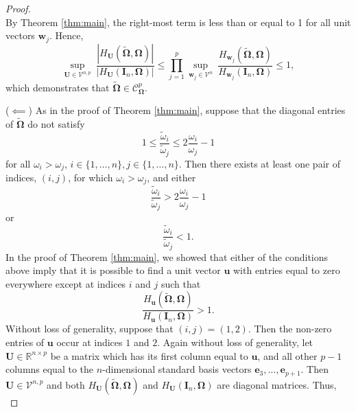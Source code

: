 \documentclass[12pt]{article}
\newcommand{\bl}[1]{{\mathbf #1}}
\newcommand{\bs}[1]{\boldsymbol #1}
\begin{document}
\begin{proof}
\begin{equation*}
\end{equation*}
By Theorem \ref{thm:main}, the right-most term is less than or equal to 1 for all unit vectors $\bl{w}_j$. Hence, 
\begin{equation*}
    \underset{\bl{U} \in \mathcal{V}^{n,p}}{\sup}~ \frac{|H_{\bl{U}}(\tilde{\bs{\Omega}}, \bs{\Omega})|}{|H_{\bl{U}}(\bl{I}_n, \bs{\Omega})|} \leq \prod_{j=1}^p \underset{\bl{w}_j \in \mathcal{V}^n}{\sup}~ \frac{H_{\bl{w}_j}(\tilde{\bs{\Omega}}, \bs{\Omega})}{H_{\bl{w}_j}(\bl{I}_n, \bs{\Omega})} \leq 1,
\end{equation*}
which demonstrates that $\tilde{\bs{\Omega}} \in \mathcal{C}^p_{\bs{\Omega}}$.

($\impliedby$) As in the proof of Theorem \ref{thm:main}, suppose that the diagonal entries of $\tilde{\bs{\Omega}}$ do not satisfy
\begin{equation*}
    1 \leq \frac{\tilde{\omega}_i}{\tilde{\omega}_j} \leq 2\frac{\omega_i}{\omega_j} - 1
\end{equation*}
for all $\omega_i > \omega_j$, $i \in \{1, \dots, n\}, j \in \{1, \dots, n\}$. Then there exists at least one pair of indices, $(i,j)$, for which $\omega_i > \omega_j$, and either
\begin{equation*}
    \frac{\tilde{\omega}_i}{\tilde{\omega}_j} > 2\frac{\omega_i}{\omega_j} - 1
\end{equation*}
or
\begin{equation*}
    \frac{\tilde{\omega}_i}{\tilde{\omega}_j} < 1.
\end{equation*}
In the proof of Theorem \ref{thm:main}, we showed that either of the conditions above imply that it is possible to find a unit vector $\bl{u}$ with entries equal to zero everywhere except at indices $i$ and $j$ such that 
\begin{equation*}
    \frac{H_{\bl{u}}(\tilde{\bs{\Omega}}, \bs{\Omega})}{H_{\bl{u}}(\bl{I}_n, \bs{\Omega})} > 1.
\end{equation*}
Without loss of generality, suppose that $(i,j) = (1,2)$. Then the non-zero entries of $\bl{u}$ occur at indices $1$ and $2$. Again without loss of generality, let $\bl{U} \in \mathbb{R}^{n \times p}$ be a matrix which has its first column equal to $\bl{u}$, and all other $p-1$ columns equal to the $n$-dimensional standard basis vectors $\bs{e}_3, \dots, \bs{e}_{p+1}$. Then $\bl{U} \in \mathcal{V}^{n,p}$ and both $H_{\bl{U}}(\tilde{\bs{\Omega}}, \bs{\Omega})$ and $H_{\bl{U}}(\bl{I}_n, \bs{\Omega})$ are diagonal matrices. Thus,
\begin{equation*}

\end{equation*}
\end{proof}
\end{document}
